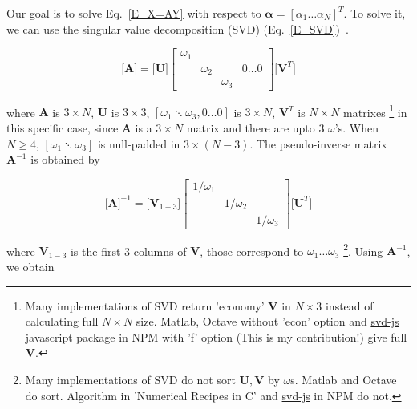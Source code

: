 \documentclass[dvipdfmx,uplatex,a4paper]{article}
\begin{document}
Our goal is to solve Eq.~\eqref{E_X=AY} with respect to $ \boldsymbol{\alpha} = [\alpha_1 \ldots \alpha_N]^T $. To solve it, we can use the singular value decomposition (SVD) (Eq.~\eqref{E_SVD})~\cite{SVD_NRC}.

\begin{equation}
  \label{E_SVD}
  \Bigg[ \boldsymbol{A} \Bigg] =
  \Bigg[ \boldsymbol{U} \Bigg]
  \left[
    \begin{array}{cccc}
      \omega_1 & \\
        & \omega_2 &   &  0 \ldots 0 \\
        &  & \omega_3 &
    \end{array}
  \right]
  \Bigg[ \boldsymbol{V}^T \Bigg]
\end{equation}

\noindent
where $ \boldsymbol{A} $ is $ 3 \times N $,
$ \boldsymbol{U} $ is $ 3 \times 3 $,
$ [\omega_1 \ddots \omega_3, 0 \ldots 0] $ is $ 3 \times N $,
$ \boldsymbol{V}^T $ is $ N \times N $ matrixes
\footnote{Many implementations of SVD return 'economy' $\boldsymbol{V}$ in $ N \times 3$ instead of calculating full $N \times N$ size. Matlab, Octave without 'econ' option and \href{https://www.npmjs.com/package/svd-js}{svd-js} javascript package in NPM with 'f' option (This is my contribution!) give full $\boldsymbol{V}$.}
in this specific case, since $ \boldsymbol{A} $ is a $ 3 \times N $ matrix and there are upto 3 $\omega$'s. When $ N \geq 4 $, $ [\omega_1 \ddots \omega_3 ] $ is null-padded in $ 3 \times (N-3) $.
The pseudo-inverse matrix $ \boldsymbol{A}^{-1} $ is obtained by

\begin{equation}
  \Bigg[ \boldsymbol{A} \Bigg]^{-1} =
  \Bigg[ \boldsymbol{V}_{1-3} \Bigg]
  \left[
    \begin{array}{ccc}
      1/\omega_1 & & \\
      & 1/\omega_2 & \\
      & & 1/\omega_3
    \end{array}
  \right]
  \Bigg[ \boldsymbol{U}^T \Bigg]
\end{equation}

\noindent
where $ \boldsymbol{V}_{1-3} $ is the first 3 columns of $ \boldsymbol{V} $, those correspond to $ \omega_1 \ldots \omega_3 $
\footnote{Many implementations of SVD do not sort $ \boldsymbol{U}, \boldsymbol{V}$ by $\omega$s. Matlab and Octave do sort. Algorithm in 'Numerical Recipes in C' and \href{https://www.npmjs.com/package/svd-js}{svd-js} in NPM do not.}.
Using $ \boldsymbol{A}^{-1} $, we obtain
\end{document}
